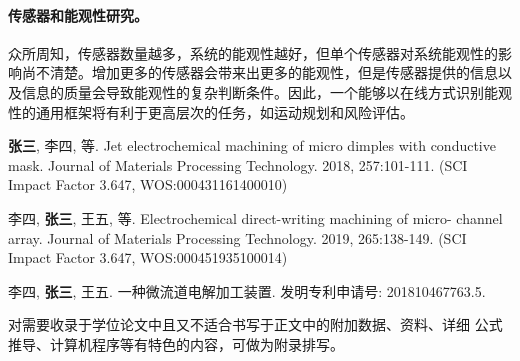 \documentclass[
  type=master
]{gdutthesis}
\begin{document}
\paragraph{传感器和能观性研究。}
众所周知，传感器数量越多，系统的能观性越好，但单个传感器对系统能观性的影响尚不清楚。增加更多的传感器会带来出更多的能观性，但是传感器提供的信息以及信息的质量会导致能观性的复杂判断条件。因此，一个能够以在线方式识别能观性的通用框架将有利于更高层次的任务，如运动规划和风险评估。

\nocite{*}%
\printbibliography



\begin{results}
  \item \textbf{张三}, 李四, 等. Jet electrochemical machining of micro dimples with conductive mask.
  Journal of Materials Processing Technology. 2018, 257:101-111. (SCI Impact Factor 3.647,
  WOS:000431161400010)
  \item 李四, \textbf{张三}, 王五, 等. Electrochemical direct-writing machining of micro- channel array.
  Journal of Materials Processing Technology. 2019, 265:138-149. (SCI Impact Factor 3.647,
  WOS:000451935100014)
\end{results}


\begin{results}
  \item 李四, \textbf{张三}, 王五. 一种微流道电解加工装置. 发明专利申请号: 201810467763.5.
\end{results}

\gdutstatement

\zhlipsum[1]

\gdutappendix

对需要收录于学位论文中且又不适合书写于正文中的附加数据、资料、详细
公式推导、计算机程序等有特色的内容，可做为附录排写。
\end{document}
